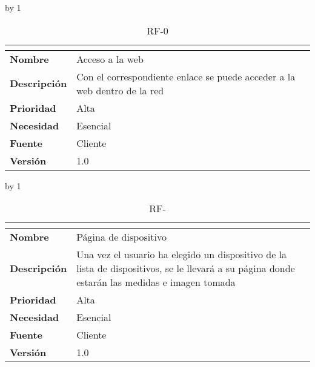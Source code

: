 \advance\rf by 1
\begin{table}[H]
	\caption{RF-0\number\rf}
	\begin{tabular}{|l|p{}|}
		\hline
		\multicolumn{2}{|c|}{\cellcolor[HTML]{BFBFBF}{\color[HTML]{000000} \textbf{RF-0\number\rf}}} \\ \hline
		\textbf{Nombre}      & Acceso a la web                                                               \\ \hline
		\textbf{Descripción} & Con el correspondiente enlace se puede acceder a la web dentro de la red \\ \hline
		\textbf{Prioridad}   & Alta                                                                          \\ \hline
		\textbf{Necesidad}   & Esencial                                                                      \\ \hline
		\textbf{Fuente}      & Cliente                                                                       \\ \hline
		\textbf{Versión}     & 1.0                                                                           \\ \hline
	\end{tabular}
\end{table}
\advance\rf by 1
\begin{table}[H]
	\caption{RF-\number\rf}
	\begin{tabular}{|l|p{}|}
		\hline
		\multicolumn{2}{|c|}{\cellcolor[HTML]{BFBFBF}{\color[HTML]{000000} \textbf{RF-\number\rf}}} \\ \hline
		\textbf{Nombre}      & Página de dispositivo                                                                                                                         \\ \hline
		\textbf{Descripción} & Una vez el usuario ha elegido un dispositivo de la lista de dispositivos, se le llevará a su página donde estarán las medidas e imagen tomada \\ \hline
		\textbf{Prioridad}   & Alta                                                                                                                                          \\ \hline
		\textbf{Necesidad}   & Esencial                                                                                                                                      \\ \hline
		\textbf{Fuente}      & Cliente                                                                                                                                       \\ \hline
		\textbf{Versión}     & 1.0                                                                                                                                           \\ \hline
	\end{tabular}
\end{table}
